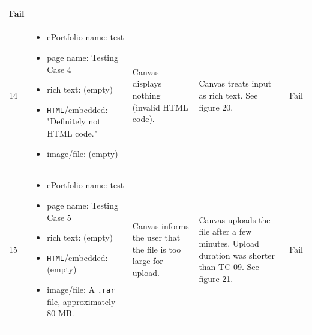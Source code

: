 \documentclass[10pt,letterpaper]{article}
\begin{document}
\begin{table}[h!]
\begin{tabularx}{\textwidth}{lXXXl}
   Fail \\ \midrule
14 &
  \begin{itemize}
    \item{ePortfolio-name: test}
    \item{page name: Testing Case 4}
    \item{rich text: (empty)}
    \item{\texttt{HTML}/embedded: "Definitely not HTML code."}
    \item{image/file: (empty)}
  \end{itemize} &
   Canvas displays nothing (invalid HTML code). &
   Canvas treats input as rich text. See figure 20. &
   Fail \\ \midrule
15 &
  \begin{itemize}
    \item{ePortfolio-name: test}
    \item{page name: Testing Case 5}
    \item{rich text: (empty)}
    \item{\texttt{HTML}/embedded: (empty)}
    \item{image/file: A \texttt{.rar} file, approximately 80 MB.}
  \end{itemize} &
   Canvas informs the user that the file is too large for upload. &
   Canvas uploads the file after a few minutes. Upload duration was shorter than TC-09. See figure 21. &
   Fail \\ \bottomrule
\end{tabularx}
\end{table}
\end{document}
